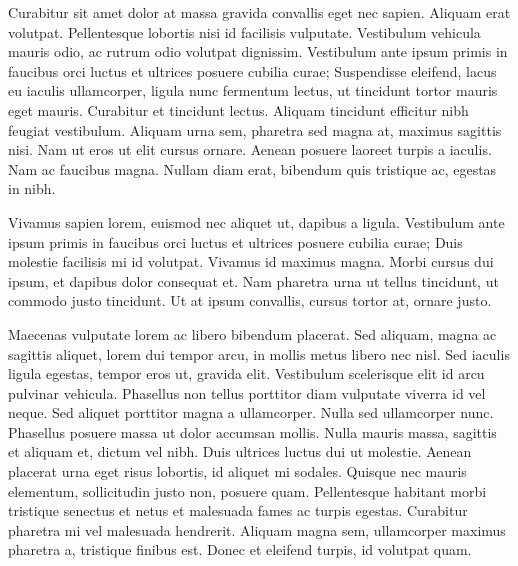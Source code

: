 Curabitur sit amet dolor at massa gravida convallis eget nec sapien. Aliquam erat volutpat. Pellentesque lobortis nisi id facilisis vulputate. Vestibulum vehicula mauris odio, ac rutrum odio volutpat dignissim. Vestibulum ante ipsum primis in faucibus orci luctus et ultrices posuere cubilia curae; Suspendisse eleifend, lacus eu iaculis ullamcorper, ligula nunc fermentum lectus, ut tincidunt tortor mauris eget mauris. Curabitur et tincidunt lectus. Aliquam tincidunt efficitur nibh feugiat vestibulum. Aliquam urna sem, pharetra sed magna at, maximus sagittis nisi. Nam ut eros ut elit cursus ornare. Aenean posuere laoreet turpis a iaculis. Nam ac faucibus magna. Nullam diam erat, bibendum quis tristique ac, egestas in nibh.

Vivamus sapien lorem, euismod nec aliquet ut, dapibus a ligula. Vestibulum ante ipsum primis in faucibus orci luctus et ultrices posuere cubilia curae; Duis molestie facilisis mi id volutpat. Vivamus id maximus magna. Morbi cursus dui ipsum, et dapibus dolor consequat et. Nam pharetra urna ut tellus tincidunt, ut commodo justo tincidunt. Ut at ipsum convallis, cursus tortor at, ornare justo.

Maecenas vulputate lorem ac libero bibendum placerat. Sed aliquam, magna ac sagittis aliquet, lorem dui tempor arcu, in mollis metus libero nec nisl. Sed iaculis ligula egestas, tempor eros ut, gravida elit. Vestibulum scelerisque elit id arcu pulvinar vehicula. Phasellus non tellus porttitor diam vulputate viverra id vel neque. Sed aliquet porttitor magna a ullamcorper. Nulla sed ullamcorper nunc. Phasellus posuere massa ut dolor accumsan mollis. Nulla mauris massa, sagittis et aliquam et, dictum vel nibh. Duis ultrices luctus dui ut molestie. Aenean placerat urna eget risus lobortis, id aliquet mi sodales. Quisque nec mauris elementum, sollicitudin justo non, posuere quam. Pellentesque habitant morbi tristique senectus et netus et malesuada fames ac turpis egestas. Curabitur pharetra mi vel malesuada hendrerit. Aliquam magna sem, ullamcorper maximus pharetra a, tristique finibus est. Donec et eleifend turpis, id volutpat quam. 

\bye